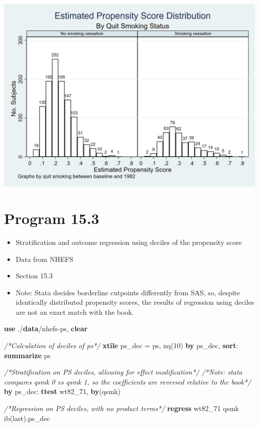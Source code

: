 \documentclass[
  10pt,
]{book}
\newenvironment{Shaded}{\begin{snugshade}}{\end{snugshade}}
\newcommand{\CommentTok}[1]{\textcolor[rgb]{0.56,0.35,0.01}{\textit{#1}}}
\newcommand{\FunctionTok}[1]{\textcolor[rgb]{0.00,0.00,0.00}{#1}}
\newcommand{\KeywordTok}[1]{\textcolor[rgb]{0.13,0.29,0.53}{\textbf{#1}}}
\newcommand{\NormalTok}[1]{#1}
\providecommand{\tightlist}{%
  \setlength{\itemsep}{0pt}\setlength{\parskip}{0pt}}
\begin{document}
\begin{center}\includegraphics[width=0.85\linewidth]{./figs/stata-fig-15-2} \end{center}

\hypertarget{program-15.3-1}{%
\section{Program 15.3}\label{program-15.3-1}}

\begin{itemize}
\tightlist
\item
  Stratification and outcome regression using deciles of the propensity score
\item
  Data from NHEFS
\item
  Section 15.3
\item
  Note: Stata decides borderline cutpoints differently from SAS, so, despite identically distributed propensity scores, the results of regression using deciles are not an exact match with the book.
\end{itemize}

\begin{Shaded}
\begin{Highlighting}[]
\KeywordTok{use}\NormalTok{ ./}\KeywordTok{data}\NormalTok{/nhefs{-}ps, }\KeywordTok{clear}

\CommentTok{/*Calculation of deciles of ps*/}
\KeywordTok{xtile}\NormalTok{ ps\_dec = ps, nq(10)}
\KeywordTok{by}\NormalTok{ ps\_dec, }\KeywordTok{sort}\NormalTok{: }\KeywordTok{summarize}\NormalTok{ ps}

\CommentTok{/*Stratification on PS deciles, allowing for effect modification*/}
\CommentTok{/*Note: stata compares qsmk 0 vs qsmk 1, so the coefficients are reversed relative to the book*/}
\KeywordTok{by}\NormalTok{ ps\_dec: }\KeywordTok{ttest}\NormalTok{ wt82\_71, }\KeywordTok{by}\NormalTok{(qsmk)}

\CommentTok{/*Regression on PS deciles, with no product terms*/}
\KeywordTok{regress}\NormalTok{ wt82\_71 qsmk ib(}\FunctionTok{last}\NormalTok{).ps\_dec}
\end{Highlighting}
\end{Shaded}
\end{document}
